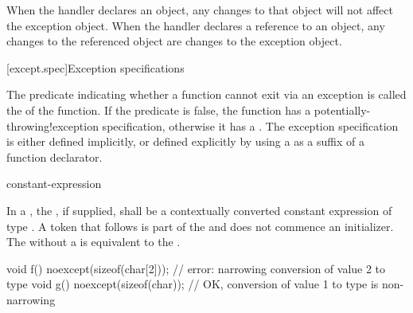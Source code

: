 \pnum
\begin{note}
When the handler declares an object,
any changes to that object will not affect the exception object.
When the handler declares a reference to an object,
any changes to the referenced object are changes to the
exception object.
\end{note}
%
%

[except.spec]{Exception specifications}%

\pnum
The predicate indicating whether a function cannot exit via an exception
is called the  of the function.
If the predicate is false,
the function has a
%
%
{potentially-throwing!exception specification},
otherwise it has a
%
.
The exception specification is either defined implicitly,
or defined explicitly
by using a 
as a suffix of a function declarator.

\begin{bnf}
\br
     \terminal{(} constant-expression \terminal{)}\br
\end{bnf}

\pnum
{}%
In a , the ,
if supplied, shall be a contextually converted constant expression
of type .
A \tcode{(} token that follows  is part of the
 and does not commence an
initializer.
The  
without a 
is
equivalent to the 
.
\begin{example}
\begin{codeblock}
void f() noexcept(sizeof(char[2])); // error: narrowing conversion of value 2 to type 
void g() noexcept(sizeof(char));    // OK, conversion of value 1 to type  is non-narrowing
\end{codeblock}
\end{example}

